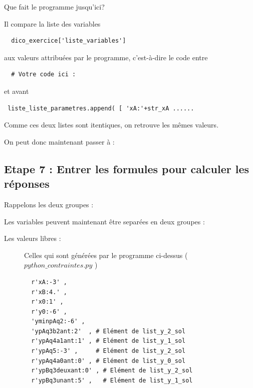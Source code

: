{Que fait le programme jusqu'ici? 

Il compare la liste des variables 
\begin{verbatim}
  dico_exercice['liste_variables'] 
\end{verbatim} 
aux valeurs attribuées par le programme, c'est-à-dire le code entre 
\begin{verbatim}
  # Votre code ici :
\end{verbatim}
et avant 
\begin{verbatim}
 liste_liste_parametres.append( [ 'xA:'+str_xA ......
\end{verbatim}

Comme ces deux listes sont itentiques, on retrouve les mêmes valeurs. 

On peut donc maintenant passer à :

\subsection{Etape 7 : Entrer les formules pour calculer les réponses  }
Rappelons les deux groupes :

Les variables peuvent maintenant être separées en deux groupes : 

\begin{description}
 \item[Les valeurs libres :] Celles qui sont générées par le programme ci-dessus ( $python\_contraintes.py$ ) 
 \begin{verbatim}
  r'xA:-3' , 
  r'xB:4.' , 
  r'x0:1' ,
  r'y0:-6' ,  
  'yminpAq2:-6' ,   
  'ypAq3b2ant:2'  , # Elément de list_y_2_sol
  r'ypAq4a1ant:1' , # Elément de list_y_1_sol
  r'ypAq5:-3' ,     # Elément de list_y_2_sol
  r'ypAq4a0ant:0' , # Elément de list_y_0_sol
  r'ypBq3deuxant:0' , # Elément de list_y_2_sol
  r'ypBq3unant:5' ,   # Elément de list_y_1_sol
 \end{verbatim}


\end{description}}
